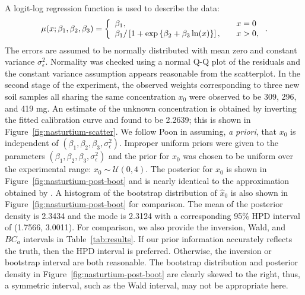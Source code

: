 \documentclass[cmfont,usenames,dvipsnames,leqno]{afit-etd}\usepackage[]{graphicx}\usepackage[]{color}
\newcommand{\mc}[1]{\ensuremath{\mathcal{#1}}}
\newcommand{\wh}[1]{\ensuremath{\widehat{#1}}}
\begin{document}
A logit-log regression function is used to describe the data:
\begin{equation*}
  \mu(x; \beta_1, \beta_2, \beta_3) = \left\{ \begin{array}{l l}
                                              \beta_1, &\quad x = 0 \\
                                              \beta_1 / \left[1 + \exp\left\{\beta_2 + \beta_3\ln(x)\right\}\right], &\quad x > 0,
                                            \end{array} \right..
\end{equation*}
The errors are assumed to be normally distributed with mean zero and constant variance $\sigma_\epsilon^2$. Normality was checked using a normal Q-Q plot of the residuals and the constant variance assumption appears reasonable from the scatterplot. In the second stage of the experiment, the observed weights corresponding to three new soil samples all sharing the same concentration $x_0$ were observed to be 309, 296, and 419 mg. An estimate of the unknown concentration is obtained by inverting the fitted calibration curve and found to be 2.2639; this is shown in Figure~\ref{fig:nasturtium-scatter}. We follow Poon in assuming, \textit{a priori}, that $x_0$ is independent of $(\beta_1, \beta_2, \beta_3, \sigma_\epsilon^2)$. Improper uniform priors were given to the parameters $(\beta_1, \beta_2, \beta_3, \sigma_\epsilon^2)$ and the prior for $x_0$ was chosen to be uniform over the experimental range: $x_0 \sim \mc{U}(0, 4)$. The posterior for $x_0$ is shown in Figure~\ref{fig:nasturtium-post-boot} and is nearly identical to the approximation obtained by \citet[fig. 9]{racine-poon_bayesian_1988}. A histogram of the bootstrap distribution of $\wh{x}_0$ is also shown in Figure~\ref{fig:nasturtium-post-boot} for comparison. The mean of the posterior  density is 2.3434 and the mode is 2.3124 with a corresponding 95\% HPD interval of (1.7566, 3.0011). For comparison, we also provide the inversion, Wald, and $BC_a$ intervals in Table~\ref{tab:results}. If our prior information accurately reflects the truth, then the HPD interval is preferred. Otherwise, the inversion or bootstrap interval are both reasonable. The bootstrap distribution and posterior density in Figure~\ref{fig:nasturtium-post-boot} are clearly skewed to the right, thus, a symmetric interval, such as the Wald interval, may not be appropriate here.
\end{document}
